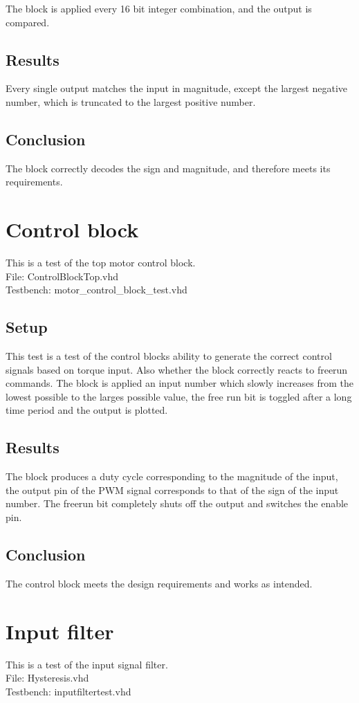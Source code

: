 The block is applied every 16 bit integer combination, and the output is compared.
\subsection*{Results}
Every single output matches the input in magnitude, except the largest negative number, which is truncated to the largest positive number.
\subsection*{Conclusion}
The block correctly decodes the sign and magnitude, and therefore meets its requirements.

\section{Control block}
This is a test of the top motor control block.\\
File: ControlBlockTop.vhd\\
Testbench: motor\_control\_block\_test.vhd
\subsection*{Setup}
This test is a test of the control blocks ability to generate the correct control signals based on torque input. Also whether the block correctly reacts to freerun commands.
The block is applied an input number which slowly increases from the lowest possible to the larges possible value, the free run bit is toggled after a long time period and the output is plotted.
\subsection*{Results}
The block produces a duty cycle corresponding to the magnitude of the input, the output pin of the PWM signal corresponds to that of the sign of the input number. The freerun bit completely shuts off the output and switches the enable pin.
\subsection*{Conclusion}
The control block meets the design requirements and works as intended.

\section{Input filter}
This is a test of the input signal filter.\\
File: Hysteresis.vhd\\
Testbench: inputfiltertest.vhd
